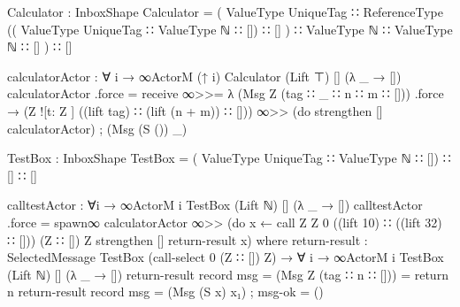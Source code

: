 \begin{code}
Calculator : InboxShape
Calculator = (
  ValueType UniqueTag ∷
  ReferenceType ((
    ValueType UniqueTag ∷
    ValueType ℕ ∷ []) ∷ []
  ) ∷
  ValueType ℕ ∷
  ValueType ℕ ∷ []
  ) ∷ []

calculatorActor : ∀ {i} → ∞ActorM (↑ i) Calculator (Lift ⊤) [] (λ _ → [])
calculatorActor .force = receive ∞>>= λ {
  (Msg Z (tag ∷ _ ∷ n ∷ m ∷ [])) .force →
    (Z ![t: Z ] ((lift tag) ∷ (lift (n + m)) ∷ [])) ∞>> (do
    strengthen []
    calculatorActor)
  ; (Msg (S ()) _)
  }

TestBox : InboxShape
TestBox = (
  ValueType UniqueTag ∷
  ValueType ℕ ∷ []) ∷
  [] ∷ []

calltestActor : ∀{i} → ∞ActorM i TestBox (Lift ℕ) [] (λ _ → [])
calltestActor .force = spawn∞ calculatorActor ∞>> (do
                       x ← call Z Z 0 ((lift 10) ∷ ((lift 32) ∷ [])) (Z ∷ []) Z
                       strengthen []
                       return-result x)
  where
    return-result : SelectedMessage {TestBox} (call-select 0 (Z ∷ []) Z) →
                    ∀ {i} → ∞ActorM i TestBox (Lift ℕ) [] (λ _ → [])
    return-result record { msg = (Msg Z (tag ∷ n ∷ [])) } = return n
    return-result record { msg = (Msg (S x) x₁) ; msg-ok = () }

\end{code}
